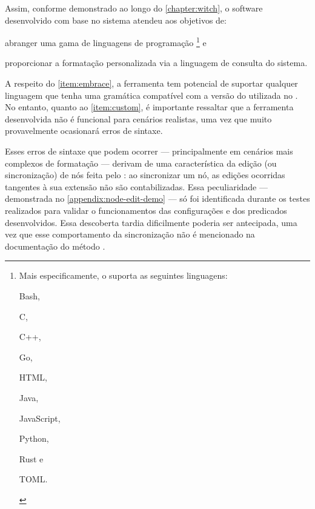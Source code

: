 \documentclass
  [11pt,a4paper,english,brazil,openright,sumario=tradicional,twoside]
  {abntex2}
\begin{document}
  Assim, conforme demonstrado ao longo do \cref{chapter:witch}, o software
  desenvolvido com base no sistema \treesitter atendeu
  aos objetivos de:
  \begin{inparaenum}
    \item \label{item:embrace} abranger uma gama de linguagens de programação%
          \footnote
            { Mais especificamente, o \witchcooking suporta as seguintes
              linguagens:
              \begin{inparaenum}[(I)]
                \item Bash,
                \item C,
                \item C++,
                \item Go,
                \item HTML,
                \item Java,
                \item JavaScript,
                \item Python,
                \item Rust e
                \item TOML.
              \end{inparaenum}}
          e
    \item \label{item:custom} proporcionar a formatação personalizada via a
          linguagem de consulta do sistema.
  \end{inparaenum}
  A respeito do \cref{item:embrace}, a ferramenta tem potencial de suportar
  qualquer linguagem que tenha uma gramática compatível com a versão do
  \treesitter utilizada no \witchcooking. No entanto, quanto ao
  \cref{item:custom}, é importante ressaltar que a ferramenta desenvolvida não
  é funcional para cenários realistas, uma vez que muito provavelmente
  ocasionará erros de sintaxe.

  Esses erros de sintaxe que podem ocorrer --- principalmente em cenários mais
  complexos de formatação --- derivam de uma característica da edição (ou
  sincronização) de nós feita pelo \treesitter: ao sincronizar um nó, as
  edições ocorridas tangentes à sua extensão não são contabilizadas. Essa
  peculiaridade --- demonstrada no \cref{appendix:node-edit-demo} --- só foi
  identificada durante os testes realizados para validar o funcionamentos das
  configurações e dos predicados desenvolvidos. Essa descoberta tardia
  dificilmente poderia ser antecipada, uma vez que esse comportamento da
  sincronização não é mencionado na documentação do método
   \cite{tree-sitter-2023-node}.
\end{document}
